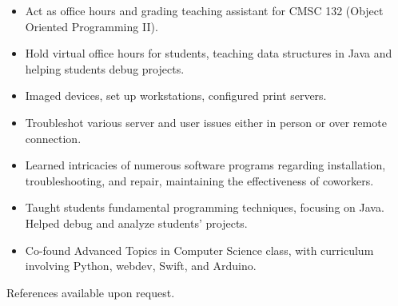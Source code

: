 \documentclass[11pt]{article}
\begin{document}
\hsep

\vspace{2mm}
{\fontsize{10}{12}\robotocondlight
    \begin{itemize}[noitemsep,nolistsep]
        \item Act as office hours and grading teaching assistant for CMSC 132 (Object Oriented Programming II).
        \item Hold virtual office hours for students, teaching data structures in Java and helping students debug projects.
    \end{itemize}
    \vspace{3mm}

    \begin{itemize}[noitemsep,nolistsep]
        \item Imaged devices, set up workstations, configured print servers. 
        \item Troubleshot various server and user issues either in person or over remote connection.
        \item Learned intricacies of numerous software programs regarding installation, troubleshooting, and repair, maintaining the effectiveness of coworkers. 
    \end{itemize}
    \vspace{3mm}
    \begin{itemize}[noitemsep,nolistsep]
        \item Taught students fundamental programming techniques, focusing on Java. Helped debug and analyze students’ projects. 
        \item Co-found Advanced Topics in Computer Science class, with curriculum involving Python, webdev, Swift, and Arduino. 
    \end{itemize}
    \vspace{3mm}

\vspace{-2mm}
{\fontsize{8}{10}\robotocondlight References available upon request.}
}
\hsep
\end{document}
